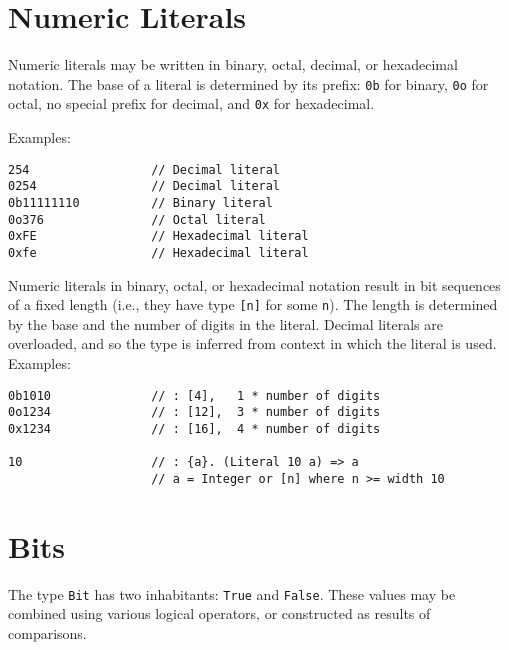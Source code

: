 \hypertarget{numeric-literals}{%
\section{Numeric Literals}\label{numeric-literals}}

Numeric literals may be written in binary, octal, decimal, or
hexadecimal notation. The base of a literal is determined by its prefix:
\texttt{0b} for binary, \texttt{0o} for octal, no special prefix for
decimal, and \texttt{0x} for hexadecimal.

Examples:

\begin{verbatim}
254                 // Decimal literal
0254                // Decimal literal
0b11111110          // Binary literal
0o376               // Octal literal
0xFE                // Hexadecimal literal
0xfe                // Hexadecimal literal
\end{verbatim}

Numeric literals in binary, octal, or hexadecimal notation result in bit
sequences of a fixed length (i.e., they have type \texttt{{[}n{]}} for
some \texttt{n}). The length is determined by the base and the number of
digits in the literal. Decimal literals are overloaded, and so the type
is inferred from context in which the literal is used. Examples:

\begin{verbatim}
0b1010              // : [4],   1 * number of digits
0o1234              // : [12],  3 * number of digits
0x1234              // : [16],  4 * number of digits

10                  // : {a}. (Literal 10 a) => a
                    // a = Integer or [n] where n >= width 10
\end{verbatim}

\hypertarget{bits}{%
\section{Bits}\label{bits}}

The type \texttt{Bit} has two inhabitants: \texttt{True} and
\texttt{False}. These values may be combined using various logical
operators, or constructed as results of comparisons.

